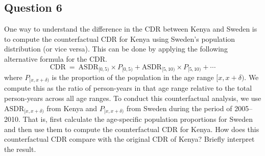 \documentclass[]{article}
\begin{document}
\subsection{Question 6}\label{question-6}

One way to understand the difference in the CDR between Kenya and Sweden
is to compute the counterfactual CDR for Kenya using Sweden's population
distribution (or vice versa). This can be done by applying the following
alternative formula for the CDR. \[
    \text{CDR}
    \ = \ \text{ASDR}_{[0, 5)} \times P_{[0,5)} + \text{ASDR}_{[5, 10)}
    \times P_{[5, 10)} + \cdots 
  \] where $P_{[x, x+\delta)}$ is the proportion of the population in
the age range $[x, x+\delta)$. We compute this as the ratio of
person-years in that age range relative to the total person-years across
all age ranges. To conduct this counterfactual analysis, we use
$\text{ASDR}_{[x,x+\delta)}$ from Kenya and $P_{[x,x+\delta)}$ from
Sweden during the period of 2005--2010. That is, first calculate the
age-specific population proportions for Sweden and then use them to
compute the counterfactual CDR for Kenya. How does this counterfactual
CDR compare with the original CDR of Kenya? Briefly interpret the
result.
\end{document}
